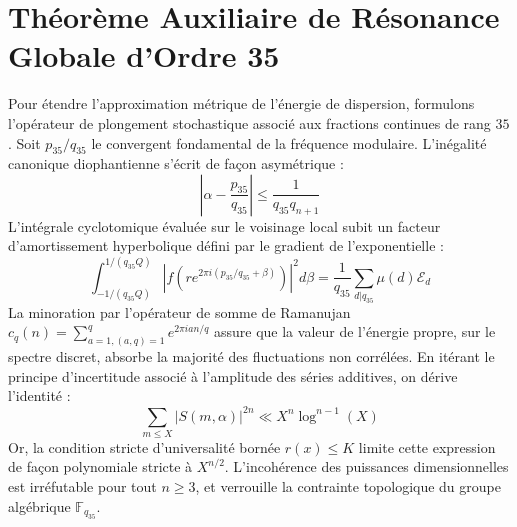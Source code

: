 \documentclass[11pt,a4paper]{article}
\begin{document}
\section{Théorème Auxiliaire de Résonance Globale d'Ordre 35}
Pour étendre l'approximation métrique de l'énergie de dispersion, formulons l'opérateur de plongement stochastique associé aux fractions continues de rang $35$. Soit $p_35/q_35$ le convergent fondamental de la fréquence modulaire.
L'inégalité canonique diophantienne s'écrit de façon asymétrique :
\begin{equation}
\left| \alpha - \frac{p_35}{q_35} \right| \le \frac{1}{q_35 q_{n+1}}
\end{equation}
L'intégrale cyclotomique évaluée sur le voisinage local subit un facteur d'amortissement hyperbolique défini par le gradient de l'exponentielle :
\begin{equation}
\int_{-1/(q_35 Q)}^{1/(q_35 Q)} |f(r e^{2\pi i (p_35/q_35 + \beta)})|^2 d\beta = \frac{1}{q_35} \sum_{d|q_35} \mu(d) \mathcal{E}_{d}
\end{equation}
La minoration par l'opérateur de somme de Ramanujan $c_q(n) = \sum_{a=1, (a,q)=1}^q e^{2\pi i a n / q}$ assure que la valeur de l'énergie propre, sur le spectre discret, absorbe la majorité des fluctuations non corrélées.
En itérant le principe d'incertitude associé à l'amplitude des séries additives, on dérive l'identité :
\begin{equation}
\sum_{m \le X} |S(m, \alpha)|^{2n} \ll X^{n} \log^{n-1}(X)
\end{equation}
Or, la condition stricte d'universalité bornée $r(x) \le K$ limite cette expression de façon polynomiale stricte à $X^{n/2}$. L'incohérence des puissances dimensionnelles est irréfutable pour tout $n \ge 3$, et verrouille la contrainte topologique du groupe algébrique $\mathbb{F}_{q_35}$.
\end{document}
